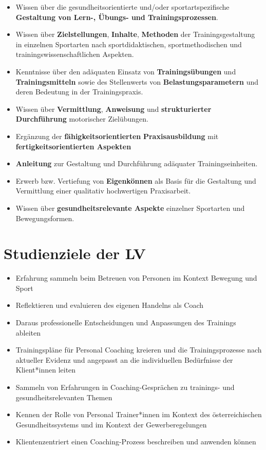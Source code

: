 \documentclass[
  letterpaper,
  DIV=11,
  numbers=noendperiod]{scrreprt}
\providecommand{\tightlist}{%
  \setlength{\itemsep}{0pt}\setlength{\parskip}{0pt}}
\begin{document}
\begin{itemize}
\item
  Wissen über die gesundheitsorientierte und/oder sportartspezifische
  \textbf{Gestaltung von Lern-, Übungs- und Trainingsprozessen}.
\item
  Wissen über \textbf{Zielstellungen}, \textbf{Inhalte},
  \textbf{Methoden} der Trainingsgestaltung in einzelnen Sportarten nach
  sportdidaktischen, sportmethodischen und trainingswissenschaftlichen
  Aspekten.
\item
  Kenntnisse über den adäquaten Einsatz von \textbf{Trainingsübungen}
  und \textbf{Trainingsmitteln} sowie des Stellenwerts von
  \textbf{Belastungsparametern} und deren Bedeutung in der
  Trainingspraxis.
\item
  Wissen über \textbf{Vermittlung}, \textbf{Anweisung} und
  \textbf{strukturierter Durchführung} motorischer Zielübungen.
\item
  Ergänzung der \textbf{fähigkeitsorientierten}
  \textbf{Praxisausbildung} mit \textbf{fertigkeitsorientierten
  Aspekten}
\item
  \textbf{Anleitung} zur Gestaltung und Durchführung adäquater
  Trainingseinheiten.
\item
  Erwerb bzw. Vertiefung von \textbf{Eigenkönnen} als Basis für die
  Gestaltung und Vermittlung einer qualitativ hochwertigen Praxisarbeit.
\item
  Wissen über \textbf{gesundheitsrelevante Aspekte} einzelner Sportarten
  und Bewegungsformen.
\end{itemize}


\chapter{Studienziele der LV}\label{sec-studienziele}

\begin{itemize}
\tightlist
\item
  Erfahrung sammeln beim Betreuen von Personen im Kontext Bewegung und
  Sport
\item
  Reflektieren und evaluieren des eigenen Handelns als Coach
\item
  Daraus professionelle Entscheidungen und Anpassungen des Trainings
  ableiten
\item
  Trainingspläne für Personal Coaching kreieren und die
  Trainingsprozesse nach aktueller Evidenz und angepasst an die
  individuellen Bedürfnisse der Klient*innen leiten
\item
  Sammeln von Erfahrungen in Coaching-Gesprächen zu trainings- und
  gesundheitsrelevanten Themen
\item
  Kennen der Rolle von Personal Trainer*innen im Kontext des
  österreichischen Gesundheitssystems und im Kontext der
  Gewerberegelungen
\item
  Klientenzentriert einen Coaching-Prozess beschreiben und anwenden
  können
\end{itemize}
\end{document}
